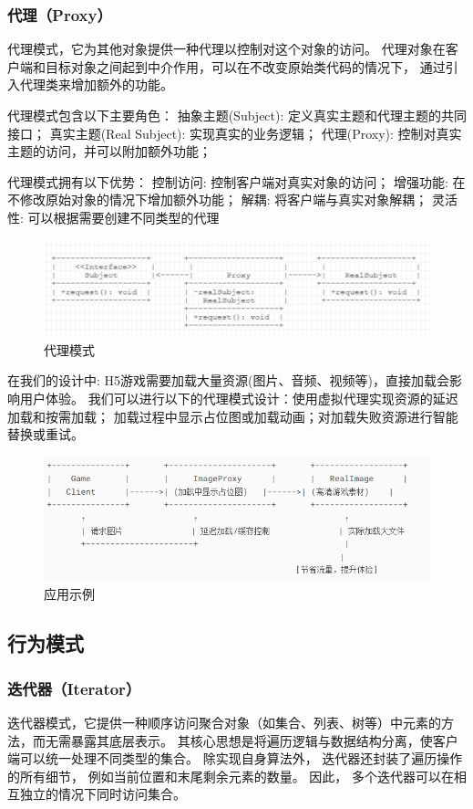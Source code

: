 \documentclass[12pt]{ctexart} %
\begin{document}
\subsubsection{代理（Proxy）} 
代理模式，它为其他对象提供一种代理以控制对这个对象的访问。
代理对象在客户端和目标对象之间起到中介作用，可以在不改变原始类代码的情况下，
通过引入代理类来增加额外的功能。

代理模式包含以下主要角色：
抽象主题(Subject): 定义真实主题和代理主题的共同接口；
真实主题(Real Subject): 实现真实的业务逻辑；
代理(Proxy): 控制对真实主题的访问，并可以附加额外功能；

代理模式拥有以下优势：
控制访问: 控制客户端对真实对象的访问；
增强功能: 在不修改原始对象的情况下增加额外功能；
解耦: 将客户端与真实对象解耦；
灵活性: 可以根据需要创建不同类型的代理
\begin{figure}[H]
  \centering
  \includegraphics[width=1\textwidth]{daili1.png}
  \caption{代理模式}
\end{figure}

在我们的设计中: H5游戏需要加载大量资源(图片、音频、视频等)，直接加载会影响用户体验。
我们可以进行以下的代理模式设计：使用虚拟代理实现资源的延迟加载和按需加载；
加载过程中显示占位图或加载动画；对加载失败资源进行智能替换或重试。
\begin{figure}[H]
  \centering
  \includegraphics[width=1\textwidth]{daili2.png}
  \caption{应用示例}
\end{figure}
\subsection{行为模式}  
\subsubsection{迭代器（Iterator）} 
迭代器模式，它提供一种顺序访问聚合对象（如集合、列表、树等）中元素的方法，而无需暴露其底层表示。
其核心思想是将遍历逻辑与数据结构分离，使客户端可以统一处理不同类型的集合。
除实现自身算法外， 迭代器还封装了遍历操作的所有细节， 例如当前位置和末尾剩余元素的数量。 
因此， 多个迭代器可以在相互独立的情况下同时访问集合。
\end{document}
